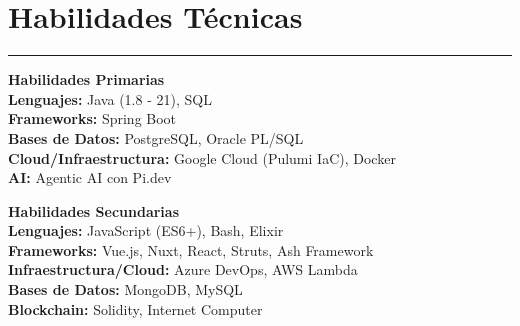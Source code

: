\documentclass[11pt,a4paper]{article}
\begin{document}
\section*{Habilidades Técnicas}
\hrule
\vspace{5pt}
\begin{minipage}[t]{0.48\textwidth}
\textbf{Habilidades Primarias} \\
\textbf{Lenguajes:} Java (1.8 - 21), SQL \\
\textbf{Frameworks:} Spring Boot \\
\textbf{Bases de Datos:} PostgreSQL, Oracle PL/SQL \\
\textbf{Cloud/Infraestructura:} Google Cloud (Pulumi IaC), Docker \\
\textbf{AI:} Agentic AI con Pi.dev
\end{minipage}
\hfill
\begin{minipage}[t]{0.48\textwidth}
\textbf{Habilidades Secundarias} \\
\textbf{Lenguajes:} JavaScript (ES6+), Bash, Elixir \\
\textbf{Frameworks:} Vue.js, Nuxt, React, Struts, Ash Framework \\
\textbf{Infraestructura/Cloud:} Azure DevOps, AWS Lambda \\
\textbf{Bases de Datos:} MongoDB, MySQL \\
\textbf{Blockchain:} Solidity, Internet Computer
\end{minipage}

\end{document}
